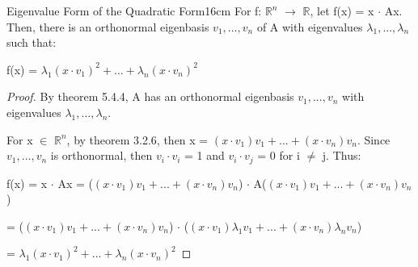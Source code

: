     \vspace{0.5cm}



    \begin{wtheorem}{Eigenvalue Form of the Quadratic Form}{16cm}
        For f: $\mathbb{R}^n$ $\rightarrow$ $\mathbb{R}$,
        let f(x) = x $\cdot$ Ax. Then, there is an orthonormal eigenbasis
        $v_1,...,v_n$ of A with eigenvalues $\lambda_1,...,\lambda_n$ such that:

        \hspace{0.5cm}
        f(x) = $\lambda_1(x \cdot v_1)^2 + ... + \lambda_n(x \cdot v_n)^2$
    \end{wtheorem}

    \begin{proof}
        By {\color{red} theorem 5.4.4}, A has an orthonormal eigenbasis
        $v_1,...,v_n$ with eigenvalues $\lambda_1,...,\lambda_n$.
        
        For x $\in$ $\mathbb{R}^n$, by {\color{red} theorem 3.2.6},
        then x = $(x \cdot v_1)v_1 + ... + (x \cdot v_n)v_n$.
        Since $v_1,...,v_n$ is orthonormal, then $v_i \cdot v_i$ = 1
        and $v_i \cdot v_j$ = 0 for i $\not =$ j. Thus:

        \hspace{0.5cm}
        f(x) = x $\cdot$ Ax
        = ($(x \cdot v_1)v_1 + ... + (x \cdot v_n)v_n$)
            $\cdot$ A($(x \cdot v_1)v_1 + ... + (x \cdot v_n)v_n$)

        \hspace{1.3cm}
        = ($(x \cdot v_1)v_1 + ... + (x \cdot v_n)v_n$)
            $\cdot$ ($(x \cdot v_1)\lambda_1v_1 +...+ (x \cdot v_n)\lambda_nv_n$)

        \hspace{1.3cm}
        = $\lambda_1(x \cdot v_1)^2 + ... + \lambda_n(x \cdot v_n)^2$
    \end{proof}

    \vspace{0.5cm}



